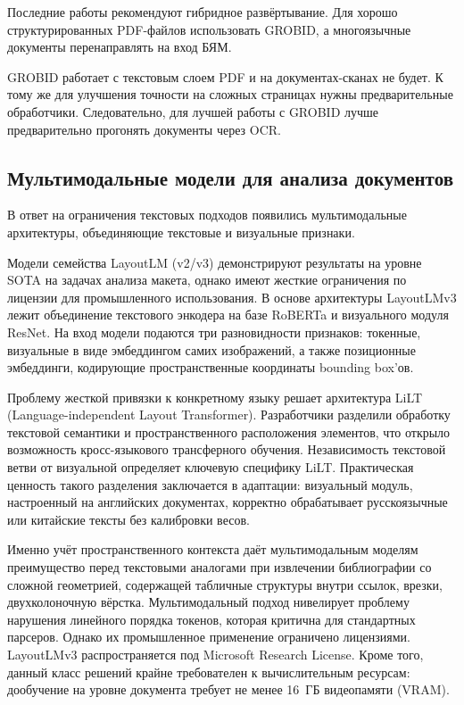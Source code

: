 Последние работы рекомендуют гибридное развёртывание\cite{zhu2026benchmarking}. Для хорошо структурированных PDF-файлов использовать GROBID, а многоязычные документы перенаправлять на вход БЯМ.

GROBID работает с текстовым слоем PDF и на документах-сканах не будет. К тому же для улучшения точности на сложных страницах нужны предварительные обработчики. Следовательно, для лучшей работы с GROBID лучше предварительно прогонять документы через OCR.

\subsection{Мультимодальные модели для анализа документов}

В ответ на ограничения текстовых подходов появились мультимодальные архи\-тек\-ту\-ры, объединяющие текстовые и визуальные признаки. 

Модели семейства LayoutLM (v2/v3) демонстрируют результаты на уровне SOTA на задачах анализа макета, однако имеют жесткие ограничения по лицензии для промышленного использования. В основе архитектуры LayoutLMv3 лежит объединение текстового энкодера на базе RoBERTa и визуального модуля ResNet. На вход модели подаются три разновидности признаков: токенные, визуальные в виде эмбеддингом самих изображений, а также позиционные эмбеддинги, кодирующие пространственные координаты bounding box'ов.

Проблему жесткой привязки к конкретному языку решает архитектура LiLT (Language-independent Layout Transformer). Разработчики разделили обработку текстовой семантики и пространственного расположения элементов, что открыло возможность кросс-языкового трансферного обучения. Независимость текстовой ветви от визуальной определяет ключевую специфику LiLT. Практическая ценность такого разделения заключается в адаптации: визуальный модуль, настроенный на английских документах, корректно обрабатывает русскоязычные или китайские тексты без калибровки весов.

Именно учёт пространственного контекста даёт мультимодальным моделям преимущество перед текстовыми аналогами при извлечении библиографии со сложной геометрией, содержащей табличные структуры внутри ссылок, врезки, двухколоночную вёрстка. Мультимодальный подход нивелирует проблему нарушения линейного порядка токенов, которая критична для стандартных парсеров. Однако их промышленное применение ограничено лицензиями. LayoutLMv3 распространяется под Microsoft Research License. Кроме того, данный класс решений крайне требователен к вычислительным ресурсам: дообучение на уровне документа требует не менее 16~ГБ видеопамяти (VRAM).

